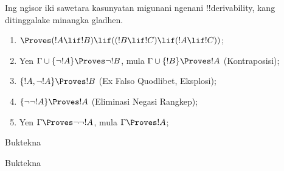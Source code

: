 \documentclass[../../../include/open-logic-section]{subfiles}
\begin{document}
Ing ngisor iki sawetara kasunyatan migunani ngenani
!!{derivability}, kang ditinggalake minangka gladhen.

\begin{prop}
\begin{enumerate}
\item $\Proves (!A \lif !B) \lif ((!B \lif !C)
  \lif (!A \lif !C))$; 
\item Yen $\Gamma \cup \{ \lnot !A\}
  \Proves \lnot !B$, mula $\Gamma \cup \{ !B\} \Proves
  !A$ (Kontraposisi); 
\item  $\{ !A, \lnot!A\} \Proves
    !B$ (Ex Falso Quodlibet, Eksplosi); 
\item  $\{ \lnot\lnot!A\} \Proves
  !A$ (Eliminasi Negasi Rangkep);
\item Yen $\Gamma \Proves \lnot\lnot!A$, mula $\Gamma \Proves
  !A$;
\end{enumerate}
\end{prop}

\begin{prob}
  Buktekna 
\end{prob}
\tagendprob

\begin{prob}
  Buktekna 
\end{prob}
\tagendprob
\end{document}
